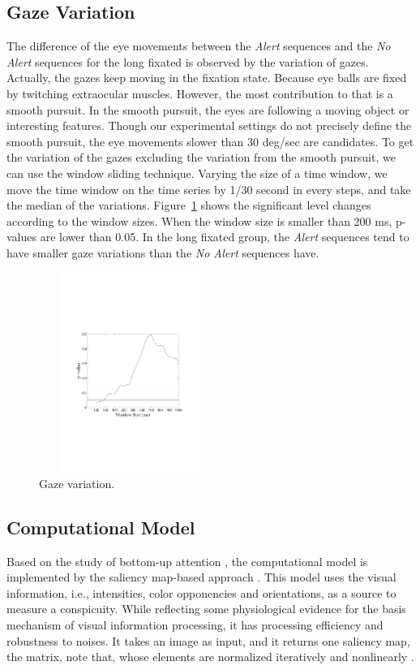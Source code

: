 \documentclass[10pt,letterpaper]{article}
\begin{document}
\subsection{Gaze Variation}

The difference of the eye movements between the \textit{Alert} sequences and the \textit{No Alert} sequences for the long fixated is observed by the variation of gazes. Actually, the gazes keep moving in the fixation state. Because eye balls are fixed by twitching extraocular muscles. However, the most contribution to that is a smooth pursuit. In the smooth pursuit, the eyes are following a moving object or interesting features. Though our experimental settings do not precisely define the smooth pursuit, the eye movements slower than 30 deg/sec are candidates. To get the variation of the gazes excluding the variation from the smooth pursuit, we can use the window sliding technique. Varying the size of a time window, we move the time window on the time series by 1/30 second in every steps, and take the median of the variations. Figure~\ref{fig:gaze-variation} shows the significant level changes according to the window sizes. When the window size is smaller than 200 ms, p-values are lower than 0.05. In the long fixated group, the \textit{Alert} sequences tend to have smaller gaze variations than the \textit{No Alert} sequences have.

\begin{figure}
  \centerline{\includegraphics[width=60mm,height=65mm,trim=48mm 85mm 48mm 86mm]{./eps/gaze_var.pdf}}
  \caption{Gaze variation.}
  \label{fig:gaze-variation}
\end{figure}


\subsection{Computational Model}

Based on the study of bottom-up attention \cite{koch1985shifts}, the computational model is implemented by the saliency map-based approach \cite{itti1998model}. This model uses the visual information, i.e., intensities, color opponencies and orientations, as a source to measure a conspicuity. While reflecting some physiological evidence for the basis mechanism of visual information processing, it has processing efficiency and robustness to noises. It takes an image as input, and it returns one saliency map, the matrix, note that, whose elements are normalized iteratively and nonlinearly \cite{itti2000saliency}.
\end{document}
